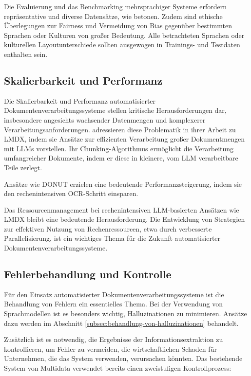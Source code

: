 Die Evaluierung und das Benchmarking mehrsprachiger Systeme erfordern repräsentative und diverse Datensätze, wie \textcite{SubramaniNishant2021ASoD} betonen. Zudem sind ethische Überlegungen zur Fairness und Vermeidung von Bias gegenüber bestimmten Sprachen oder Kulturen von großer Bedeutung. Alle betrachteten Sprachen oder kulturellen Layoutunterschiede sollten ausgewogen in Trainings- und Testdaten enthalten sein.

\subsection{Skalierbarkeit und Performanz}
\label{subsec:skalierbarkeit-und-performanz}

Die Skalierbarkeit und Performanz automatisierter Dokumentenverarbeitungssysteme stellen kritische Herausforderungen dar, insbesondere angesichts wachsender Datenmengen und komplexerer Verarbeitungsanforderungen. \textcite{PerotVincent2024LLMD} adressieren diese Problematik in ihrer Arbeit zu \gls{LMDX}, indem sie Ansätze zur effizienten Verarbeitung großer Dokumentmengen mit \glspl{LLM} vorstellen. Ihr Chunking-Algorithmus ermöglicht die Verarbeitung umfangreicher Dokumente, indem er diese in kleinere, vom \gls{LLM} verarbeitbare Teile zerlegt.

Ansätze wie \gls{DONUT} \parencite{KimGeewook2022ODUT} erzielen eine bedeutende Performanzsteigerung, indem sie den rechenintensiven \gls{OCR}-Schritt einsparen.

Das Ressourcenmanagement bei rechenintensiven \gls{LLM}-basierten Ansätzen wie \gls{LMDX} \parencite{PerotVincent2024LLMD} bleibt eine bedeutende Herausforderung. Die Entwicklung von Strategien zur effektiven Nutzung von Rechenressourcen, etwa durch verbesserte Parallelisierung, ist ein wichtiges Thema für die Zukunft automatisierter Dokumentenverarbeitungssysteme.

\subsection{Fehlerbehandlung und Kontrolle}
\label{subsec:fehlerbehandlung-und-kontrolle}

Für den Einsatz automatisierter Dokumentenverarbeitungssysteme ist die Behandlung von Fehlern ein essentielles Thema. Bei der Verwendung von Sprachmodellen ist es besonders wichtig, Halluzinationen zu minimieren. Ansätze dazu werden im Abschnitt \ref{subsec:behandlung-von-halluzinationen} behandelt.

Zusätzlich ist es notwendig, die Ergebnisse der Informationsextraktion zu kontrollieren, um Fehler zu vermeiden, die wirtschaftlichen Schaden für Unternehmen, die das System verwenden, verursachen könnten. Das bestehende System von Multidata verwendet bereits einen zweistufigen Kontrollprozess:

